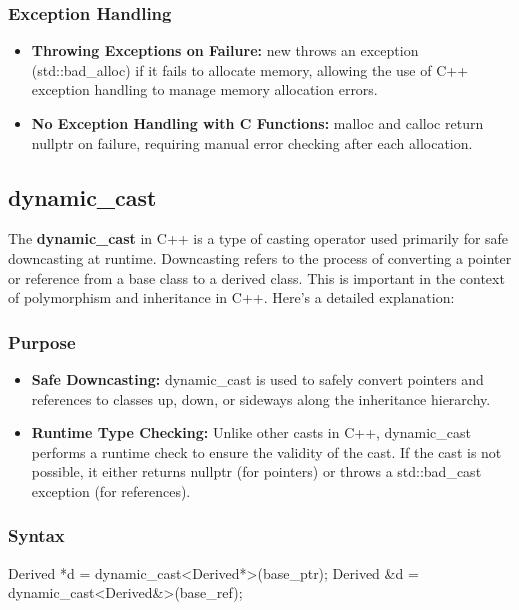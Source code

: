 \documentclass{report}
\begin{document}
\begin{concept}
    \bigbreak \noindent 
    \subsubsection{Exception Handling}
    \begin{itemize}
        \item \textbf{Throwing Exceptions on Failure:} new throws an exception (std::bad\_alloc) if it fails to allocate memory, allowing the use of C++ exception handling to manage memory allocation errors.
        \item \textbf{No Exception Handling with C Functions:} malloc and calloc return nullptr on failure, requiring manual error checking after each allocation.
    \end{itemize}

    \pagebreak 
    \bigbreak \noindent 

    \subsection{dynamic\_cast}
    \bigbreak \noindent 
    \begin{concept}
        The \textbf{dynamic\_cast} in C++ is a type of casting operator used primarily for safe downcasting at runtime. Downcasting refers to the process of converting a pointer or reference from a base class to a derived class. This is important in the context of polymorphism and inheritance in C++. Here's a detailed explanation:
    \end{concept}
    \bigbreak \noindent 
    \subsubsection{Purpose}
    \begin{itemize}
        \item \textbf{Safe Downcasting:} dynamic\_cast is used to safely convert pointers and references to classes up, down, or sideways along the inheritance hierarchy.
        \item \textbf{Runtime Type Checking:} Unlike other casts in C++, dynamic\_cast performs a runtime check to ensure the validity of the cast. If the cast is not possible, it either returns nullptr (for pointers) or throws a std::bad\_cast exception (for references).
    \end{itemize}
    \bigbreak \noindent 
    \subsubsection{Syntax}
    \bigbreak \noindent 
    \begin{cppcode}
    Derived *d = dynamic_cast<Derived*>(base_ptr);
    Derived &d = dynamic_cast<Derived&>(base_ref);
   \end{cppcode}


\end{concept}
\end{document}
